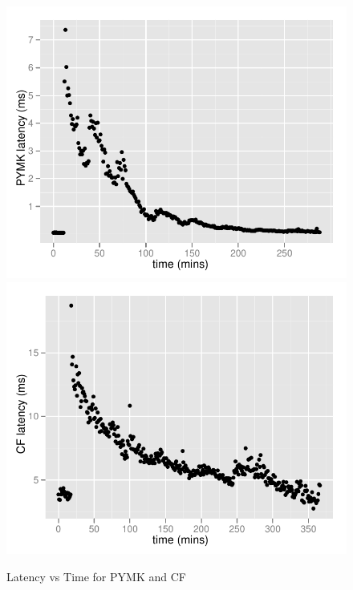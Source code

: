 \begin{figure}
  \centering
    \includegraphics[scale=0.55]{images/pymk_search.pdf}
    \includegraphics[scale=0.55]{images/browsemap_search.pdf}
  \caption{Latency vs Time for PYMK and CF}
  \label{production}
\end{figure}

